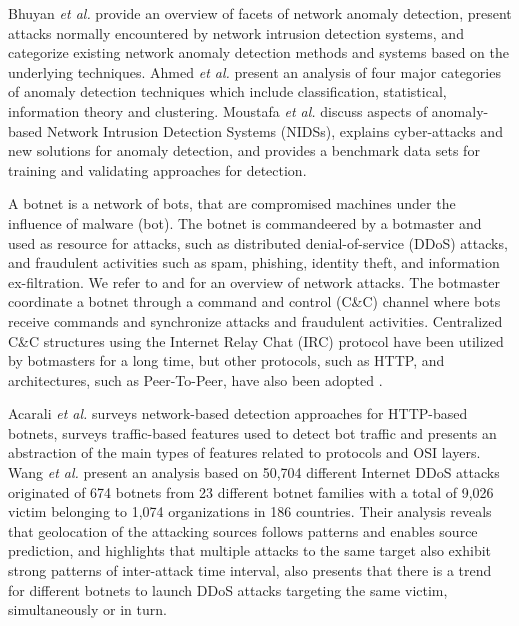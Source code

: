Bhuyan \emph{et al.} \cite{bhuyan2014network} provide an overview of facets of network anomaly detection, present attacks normally encountered by network intrusion detection systems, and categorize existing network anomaly detection methods and systems based on the underlying techniques. Ahmed \emph{et al.} \cite{ahmed2016survey} present an analysis of four major categories of anomaly detection techniques which include classification, statistical, information theory and clustering. Moustafa \emph{et al.} \cite{moustafa2019holistic} discuss aspects of anomaly-based Network Intrusion Detection Systems (NIDSs), explains cyber-attacks and new solutions for anomaly detection, and provides a benchmark data sets for training and validating approaches for detection. 

A botnet is a network of bots, that are compromised machines under the influence of malware (bot). The botnet is commandeered by a botmaster and used as resource for attacks, such as distributed denial-of-service (DDoS) attacks, and fraudulent activities such as spam, phishing, identity theft, and information ex-filtration. We refer to \cite{ahmed2016survey} and \cite{moustafa2019holistic} for an overview of network attacks. The botmaster coordinate a botnet through a command and control (C\&C) channel where bots receive commands and synchronize attacks and fraudulent activities. Centralized C\&C structures using the Internet Relay Chat (IRC) protocol have been utilized by botmasters for a long time, but other protocols, such as HTTP, and architectures, such as Peer-To-Peer, have also been adopted \cite{gu2008botminer}.

Acarali \emph{et al.} \cite{acarali2016survey} surveys network-based detection approaches for HTTP-based botnets, surveys traffic-based features used to detect bot traffic and presents an abstraction of the main types of features related to protocols and OSI layers. Wang \emph{et al.} \cite{Wang2018ddosbotnetssurvey} present an analysis based on 50,704 different Internet DDoS attacks originated of 674 botnets from 23 different botnet families with a total of 9,026 victim belonging to 1,074 organizations in 186 countries. Their analysis reveals that geolocation of the attacking sources follows patterns and enables source prediction, and highlights that multiple attacks to the same target also exhibit strong patterns of inter-attack time interval, also presents that there is a trend for different botnets to launch DDoS attacks targeting the same victim, simultaneously or in turn.

